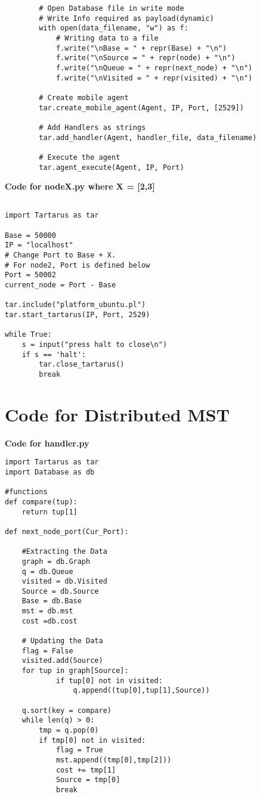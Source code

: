 \documentclass[12t]{csethesis}
\begin{document}
\begin{appendices}
\begin{lstlisting}
        # Open Database file in write mode
        # Write Info required as payload(dynamic)
        with open(data_filename, "w") as f:
            # Writing data to a file 
            f.write("\nBase = " + repr(Base) + "\n")
            f.write("\nSource = " + repr(node) + "\n")
            f.write("\nQueue = " + repr(next_node) + "\n")
            f.write("\nVisited = " + repr(visited) + "\n")
        
        # Create mobile agent
        tar.create_mobile_agent(Agent, IP, Port, [2529])

        # Add Handlers as strings
        tar.add_handler(Agent, handler_file, data_filename)

        # Execute the agent
        tar.agent_execute(Agent, IP, Port)

\end{lstlisting}
\clearpage
\textbf{Code for nodeX.py where X = [2,3]}
\begin{lstlisting}

import Tartarus as tar

Base = 50000
IP = "localhost"
# Change Port to Base + X.
# For node2, Port is defined below
Port = 50002
current_node = Port - Base

tar.include("platform_ubuntu.pl")
tar.start_tartarus(IP, Port, 2529)

while True:
    s = input("press halt to close\n")
    if s == 'halt':
        tar.close_tartarus()
        break

\end{lstlisting}
\chapter{Code for Distributed MST} \label{dmst}
\textbf{Code for handler.py}
\begin{lstlisting}
import Tartarus as tar
import Database as db

#functions 
def compare(tup):
    return tup[1]

def next_node_port(Cur_Port):

    #Extracting the Data
    graph = db.Graph
    q = db.Queue
    visited = db.Visited
    Source = db.Source
    Base = db.Base
    mst = db.mst
    cost =db.cost
    
    # Updating the Data
    flag = False
    visited.add(Source)
    for tup in graph[Source]:
            if tup[0] not in visited:
                q.append((tup[0],tup[1],Source))
        
    q.sort(key = compare)
    while len(q) > 0:
        tmp = q.pop(0)
        if tmp[0] not in visited:
            flag = True
            mst.append((tmp[0],tmp[2]))
            cost += tmp[1]
            Source = tmp[0]
            break


\end{lstlisting}
\end{appendices}
\end{document}
